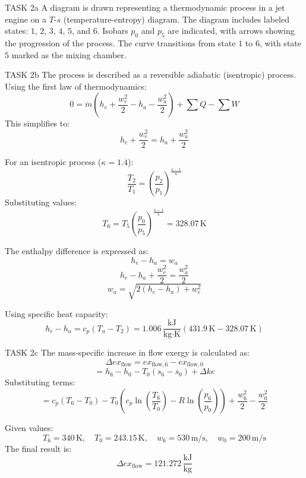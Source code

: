 TASK 2a  
A diagram is drawn representing a thermodynamic process in a jet engine on a \( T \)-\( s \) (temperature-entropy) diagram. The diagram includes labeled states: \( 1 \), \( 2 \), \( 3 \), \( 4 \), \( 5 \), and \( 6 \). Isobars \( p_0 \) and \( p_5 \) are indicated, with arrows showing the progression of the process. The curve transitions from state \( 1 \) to \( 6 \), with state \( 5 \) marked as the mixing chamber.  

TASK 2b  
The process is described as a reversible adiabatic (isentropic) process. Using the first law of thermodynamics:  
\[
0 = \dot{m} \left( h_e + \frac{w_e^2}{2} - h_a - \frac{w_a^2}{2} \right) + \sum Q - \sum W
\]  
This simplifies to:  
\[
h_e + \frac{w_e^2}{2} = h_a + \frac{w_a^2}{2}
\]  

For an isentropic process (\( \kappa = 1.4 \)):  
\[
\frac{T_2}{T_1} = \left( \frac{p_2}{p_1} \right)^{\frac{\kappa - 1}{\kappa}}
\]  
Substituting values:  
\[
T_6 = T_5 \left( \frac{p_0}{p_5} \right)^{\frac{\kappa - 1}{\kappa}} = 328.07 \, \text{K}
\]  

The enthalpy difference is expressed as:  
\[
h_e - h_a = w_a
\]  
\[
h_e - h_a + \frac{w_e^2}{2} = \frac{w_a^2}{2}
\]  
\[
w_a = \sqrt{2(h_e - h_a) + w_e^2}
\]  

Using specific heat capacity:  
\[
h_e - h_a = c_p \left( T_a - T_2 \right) = 1.006 \, \frac{\text{kJ}}{\text{kg·K}} \left( 431.9 \, \text{K} - 328.07 \, \text{K} \right)
\]  

TASK 2c  
The mass-specific increase in flow exergy is calculated as:  
\[
\Delta ex_{\text{flow}} = ex_{\text{flow},6} - ex_{\text{flow},0}
\]  
\[
= h_6 - h_0 - T_0 (s_6 - s_0) + \Delta ke
\]  
Substituting terms:  
\[
= c_p (T_6 - T_0) - T_0 \left( c_p \ln \left( \frac{T_6}{T_0} \right) - R \ln \left( \frac{p_6}{p_0} \right) \right) + \frac{w_6^2}{2} - \frac{w_0^2}{2}
\]  

Given values:  
\[
T_6 = 340 \, \text{K}, \quad T_0 = 243.15 \, \text{K}, \quad w_6 = 530 \, \text{m/s}, \quad w_0 = 200 \, \text{m/s}
\]  
The final result is:  
\[
\Delta ex_{\text{flow}} = 121.272 \, \frac{\text{kJ}}{\text{kg}}
\]
